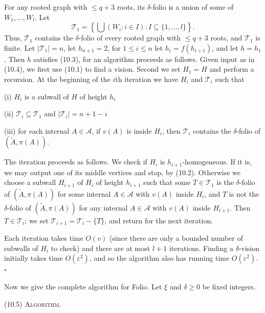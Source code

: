 For any rooted graph with $\le q+3$ roots, its $\delta$-folio is a union of some of $W_1, \dots, W_l$. Let
\begin{equation*}
\mathcal{T}_1 = \left\{ \bigcup (W_i : i \in I) : I \subseteq \{1, \dots, l\} \right\}.
\end{equation*}
Thus, $\mathcal{T}_1$ contains the $\delta$-folio of every rooted graph with $\le q+3$ roots, and $\mathcal{T}_1$ is finite. Let $|\mathcal{T}_1| = n$, let $h_{n+1} = 2$, for $1 \le i \le n$ let $h_i = f(h_{i+1})$, and let $h = h_1$. Then $h$ satisfies (10.3), for an algorithm proceeds as follows. Given input as in (10.4), we first use (10.1) to find a vision. Second we set $H_1 = H$ and perform a recursion. At the beginning of the $i$th iteration we have $H_i$ and $\mathcal{T}_i$ such that

\hspace*{12pt}(i) $H_i$ is a subwall of $H$ of height $h_i$

\hspace*{12pt}(ii) $\mathcal{T}_i \subseteq \mathcal{T}_1$ and $|\mathcal{T}_i| = n + 1 - i$

\hspace*{12pt}(iii) for each internal $A \in \mathcal{A}$, if $v(A)$ is inside $H_i$, then $\mathcal{T}_i$ contains the $\delta$-folio of $(\tilde{A}, \pi(A))$.

The iteration proceeds as follows. We check if $H_i$ is $h_{i+1}$-homogeneous. If it is, we may output one of its middle vertices and stop, by (10.2). Otherwise we choose a subwall $H_{i+1}$ of $H_i$ of height $h_{i+1}$ such that some $T \in \mathcal{T}_1$ is the $\delta$-folio of $(\tilde{A}, \pi(A))$ for some internal $A \in \mathcal{A}$ with $v(A)$ inside $H_i$, and $T$ is not the $\delta$-folio of $(\tilde{A}, \pi(A))$ for any internal $A \in \mathcal{A}$ with $v(A)$ inside $H_{i+1}$. Then $T \in \mathcal{T}_i$; we set $\mathcal{T}_{i+1} = \mathcal{T}_i - \{T\}$, and return for the next iteration.

Each iteration takes time $O(v)$ (since there are only a bounded number of subwalls of $H_i$ to check) and there are at most $l+1$ iterations. Finding a $\delta$-vision initially takes time $O(\varepsilon^2)$, and so the algorithm also has running time $O(\varepsilon^2)$. $\square$

Now we give the complete algorithm for Folio. Let $\xi$ and $\delta \ge 0$ be fixed integers.

\stmt
(10.5) \textsc{Algorithm}.


